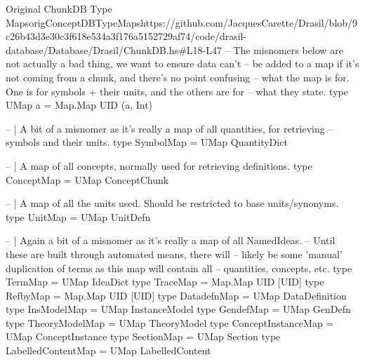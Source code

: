 \begin{haskell}{Original ChunkDB Type Maps}{origConceptDBTypeMaps}{https://github.com/JacquesCarette/Drasil/blob/9c26b43d3e30c3f618e534a3f176a5152729af74/code/drasil-database/Database/Drasil/ChunkDB.hs\#L18-L47}
-- The misnomers below are not actually a bad thing, we want to ensure data can't
-- be added to a map if it's not coming from a chunk, and there's no point confusing
-- what the map is for. One is for symbols + their units, and the others are for
-- what they state.
type UMap a = Map.Map UID (a, Int)

-- | A bit of a misnomer as it's really a map of all quantities, for retrieving
-- symbols and their units.
type SymbolMap  = UMap QuantityDict

-- | A map of all concepts, normally used for retrieving definitions.
type ConceptMap = UMap ConceptChunk

-- | A map of all the units used. Should be restricted to base units/synonyms.
type UnitMap = UMap UnitDefn

-- | Again a bit of a misnomer as it's really a map of all NamedIdeas.
-- Until these are built through automated means, there will
-- likely be some 'manual' duplication of terms as this map will contain all
-- quantities, concepts, etc.
type TermMap = UMap IdeaDict
type TraceMap = Map.Map UID [UID]
type RefbyMap = Map.Map UID [UID]
type DatadefnMap = UMap DataDefinition
type InsModelMap = UMap InstanceModel
type GendefMap = UMap GenDefn
type TheoryModelMap = UMap TheoryModel
type ConceptInstanceMap = UMap ConceptInstance
type SectionMap = UMap Section
type LabelledContentMap = UMap LabelledContent
\end{haskell}
